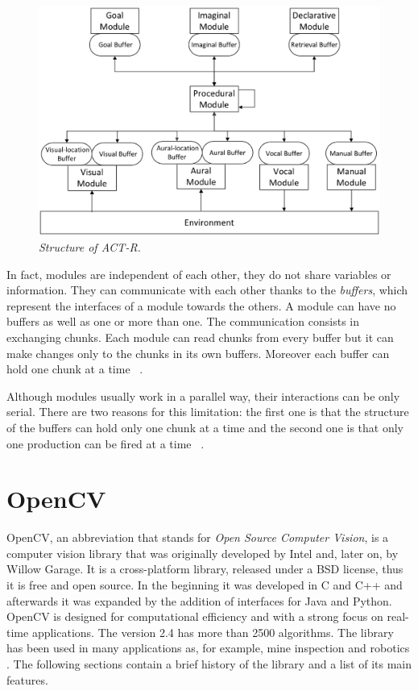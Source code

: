 	\begin{figure}[h]
	  \begin{center} 
	    \includegraphics[scale=0.25]{images/ch_01/actr.eps}
	  \end{center} 
	  \caption{\textit{Structure of ACT-R.}}  
	  \label{fig:modulesActr}
	\end{figure}
	
	
	In fact, modules are independent of each other, they do not share variables or information. They can communicate with each other thanks to the \emph{buffers}, which represent the interfaces of a module towards the others. A module can have no buffers as well as one or more than one. The communication consists in exchanging chunks. Each module can read chunks from every buffer but it can make changes only to the chunks in its own buffers. Moreover each buffer can hold one chunk at a time ~\cite{actr6refman}. 

	Although modules usually work in a parallel way, their interactions can be only serial.
	There are two reasons for this limitation: the first one is that the structure of the buffers can hold only one chunk at a time and the second one is that only one production can be fired at a time ~\cite{actr6refman}.
	
  \section{OpenCV}
	\mbox{OpenCV}, an abbreviation that stands for \emph{Open Source Computer Vision}, is a computer vision library that was originally developed by Intel and, later on, by Willow Garage.
	It is a cross-platform library, released under a BSD license, thus it is free and open source. In the beginning it was developed in C and C++ and afterwards it was expanded by the addition of interfaces for Java and Python. \mbox{OpenCV} is designed for computational efficiency and with a strong focus on real-time applications. The version 2.4 has more than 2500 algorithms. The library has been used in many applications as, for example, mine inspection and robotics \cite{OpenCV:MainWebPage}. The following sections contain a brief history of the library and a list of its main features.
		
